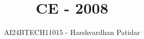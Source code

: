 \documentclass[journal]{IEEEtran}
\begin{document}

\vspace{3cm}

\title{CE - 2008}
\author{AI24BTECH11015 - Harshvardhan Patidar}
 \maketitle
{\let\newpage\relax\maketitle}

\renewcommand{\thefigure}{\theenumi}
\renewcommand{\thetable}{\theenumi}
\setlength{\intextsep}{10pt} %


\renewcommand{\thetable}{\theenumi}
\end{document}

